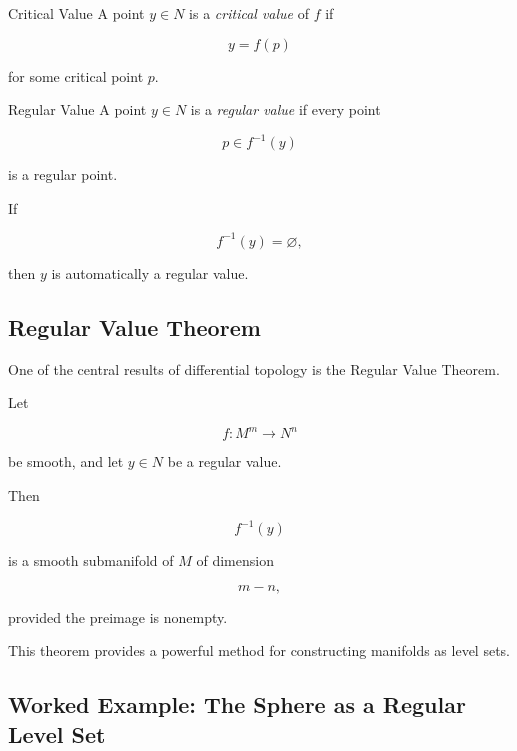 \begin{definitionbox}{Critical Value}
A point \(y\in N\) is a \emph{critical value} of \(f\) if

\[
y=f(p)
\]

for some critical point \(p\).
\end{definitionbox}

\begin{definitionbox}{Regular Value}
A point \(y\in N\) is a \emph{regular value} if every point

\[
p\in f^{-1}(y)
\]

is a regular point.
\end{definitionbox}

If

\[
f^{-1}(y)=\varnothing,
\]

then \(y\) is automatically a regular value.

\subsection{Regular Value Theorem}
\label{subsec:regular-value-theorem}

One of the central results of differential topology is the Regular Value
Theorem.

\begin{theorem}
Let

\[
f:M^m\to N^n
\]

be smooth, and let \(y\in N\) be a regular value.

Then

\[
\boxed{
f^{-1}(y)
}
\]

is a smooth submanifold of \(M\) of dimension

\[
\boxed{
m-n,
}
\]

provided the preimage is nonempty.
\end{theorem}

This theorem provides a powerful method for constructing manifolds as level
sets.

\subsection{Worked Example: The Sphere as a Regular Level Set}
\label{subsec:sphere-regular-level-set}

